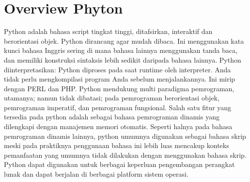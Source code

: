 \section{Overview Phyton}
Python adalah bahasa script tingkat tinggi, ditafsirkan,
interaktif dan berorientasi objek. Python dirancang agar
mudah dibaca. Ini menggunakan kata kunci bahasa Inggris
sering di mana bahasa lainnya menggunakan tanda baca,
dan memiliki konstruksi sintaksis lebih sedikit daripada
bahasa lainnya.
Python diinterpretasikan: Python diproses pada saat runtime
oleh interpreter. Anda tidak perlu mengkompilasi program
Anda sebelum menjalankannya. Ini mirip dengan PERL dan
PHP.
Python mendukung multi paradigma pemrograman, utamanya; namun tidak dibatasi; pada pemrograman berorientasi objek, pemrograman
imperatif, dan pemrograman fungsional. Salah satu fitur yang tersedia pada python adalah sebagai bahasa pemrograman dinamis yang
dilengkapi dengan manajemen memori otomatis. Seperti halnya pada bahasa pemrograman dinamis lainnya, python umumnya digunakan sebagai
bahasa skrip meski pada praktiknya penggunaan bahasa ini lebih luas mencakup konteks pemanfaatan yang umumnya tidak dilakukan dengan
menggunakan bahasa skrip. Python dapat digunakan untuk berbagai keperluan pengembangan perangkat lunak dan dapat berjalan di berbagai
platform sistem operasi.

